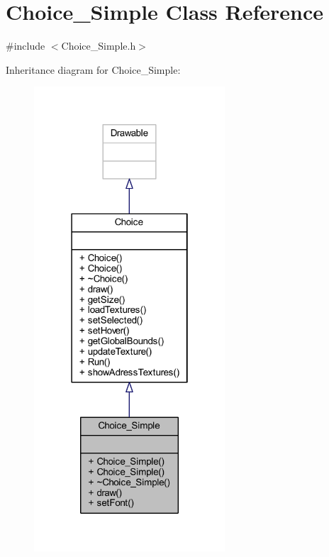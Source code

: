 \hypertarget{class_choice___simple}{}\section{Choice\+\_\+\+Simple Class Reference}
\label{class_choice___simple}


{\ttfamily \#include $<$Choice\+\_\+\+Simple.\+h$>$}



Inheritance diagram for Choice\+\_\+\+Simple\+:\nopagebreak
\begin{figure}[H]
\begin{center}
\leavevmode
\includegraphics[width=202pt]{class_choice___simple__inherit__graph}
\end{center}
\end{figure}


